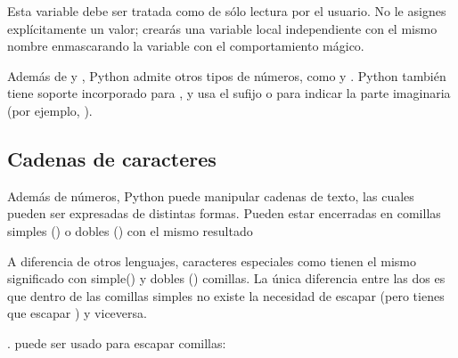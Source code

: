 \documentclass[a5paper,10pt,spanish]{sphinxmanual}
\begin{document}
\sphinxAtStartPar
Esta variable debe ser tratada como de sólo lectura por el usuario. No le asignes explícitamente un valor; crearás una variable local independiente con el mismo nombre enmascarando la variable con el comportamiento mágico.

\sphinxAtStartPar
Además de  y , Python admite otros tipos de números, como  y . Python también tiene soporte incorporado para , y usa el sufijo  o  para indicar la parte imaginaria (por ejemplo, ).


\subsection{Cadenas de caracteres}
\label{\detokenize{tutorial/introduction:strings}}\label{\detokenize{tutorial/introduction:tut-strings}}
\sphinxAtStartPar
Además de números, Python puede manipular cadenas de texto, las cuales pueden ser expresadas de distintas formas. Pueden estar encerradas en comillas simples () o dobles ()  con el mismo resultado %
\begin{footnote}[2]\sphinxAtStartFootnote
A diferencia de otros lenguajes, caracteres especiales como  tienen el mismo significado con simple() y dobles () comillas. La única diferencia entre las dos es que dentro de las comillas simples no existe la necesidad de escapar  (pero tienes que escapar ) y viceversa.
%
\end{footnote}.  \sphinxcode{\sphinxupquote{\textbackslash{}}} puede ser usado para escapar comillas:
\end{document}
